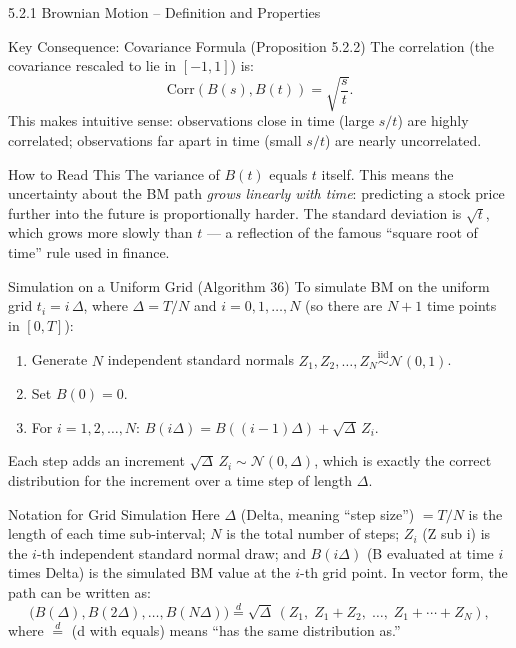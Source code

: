 \documentclass[aspectratio=169,10pt]{beamer}
\begin{document}
\begin{frame}[allowframebreaks]{5.2.1 Brownian Motion -- Definition and Properties}
\begin{block}{Key Consequence: Covariance Formula (Proposition 5.2.2)}
  The correlation (the covariance rescaled to lie in $[-1, 1]$) is:
  \[
    \mathrm{Corr}(B(s), B(t)) = \sqrt{\frac{s}{t}}.
  \]
  This makes intuitive sense: observations close in time (large $s/t$) are
  highly correlated; observations far apart in time (small $s/t$) are nearly
  uncorrelated.
\end{block}

\begin{alertblock}{How to Read This}
  The variance of $B(t)$ equals $t$ itself.  This means the uncertainty about
  the BM path \emph{grows linearly with time}: predicting a stock price further
  into the future is proportionally harder.  The standard deviation is
  $\sqrt{t}$, which grows more slowly than $t$ --- a reflection of the famous
  ``square root of time'' rule used in finance.
\end{alertblock}

\framebreak

\begin{block}{Simulation on a Uniform Grid (Algorithm 36)}
  To simulate BM on the uniform grid $t_i = i\,\Delta$, where $\Delta = T/N$
  and $i = 0, 1, \ldots, N$ (so there are $N + 1$ time points in $[0, T]$):
  \begin{enumerate}
    \item Generate $N$ independent standard normals $Z_1, Z_2, \ldots, Z_N
          \overset{\mathrm{iid}}{\sim} \mathcal{N}(0,1)$.
    \item Set $B(0) = 0$.
    \item For $i = 1, 2, \ldots, N$: $B(i\Delta) = B((i-1)\Delta) + \sqrt{\Delta}\,Z_i$.
  \end{enumerate}
  Each step adds an increment $\sqrt{\Delta}\,Z_i \sim \mathcal{N}(0,\Delta)$,
  which is exactly the correct distribution for the increment over a time step of
  length $\Delta$.
\end{block}

\begin{block}{Notation for Grid Simulation}
  Here $\Delta$ (Delta, meaning ``step size'') $= T/N$ is the length of each
  time sub-interval; $N$ is the total number of steps; $Z_i$ (Z sub i) is the
  $i$-th independent standard normal draw; and $B(i\Delta)$ (B evaluated at
  time $i$ times Delta) is the simulated BM value at the $i$-th grid point.
  In vector form, the path can be written as:
  \[
    \bigl(B(\Delta), B(2\Delta), \ldots, B(N\Delta)\bigr)
    \overset{d}{=}
    \sqrt{\Delta}\,(Z_1,\; Z_1 + Z_2,\; \ldots,\; Z_1 + \cdots + Z_N),
  \]
  where $\overset{d}{=}$ (d with equals) means ``has the same distribution as.''
\end{block}


\end{frame}
\end{document}
